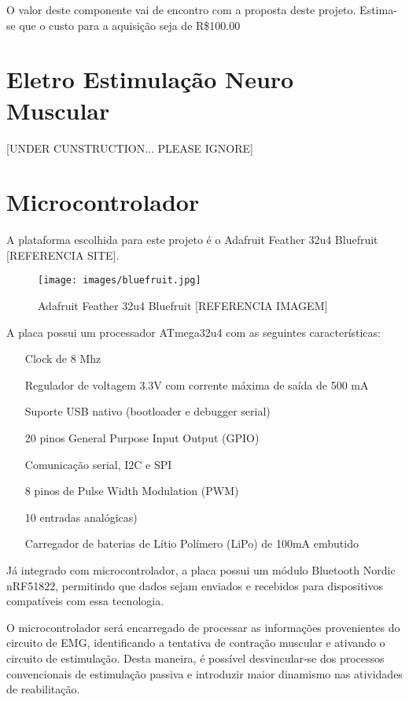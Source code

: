 \documentclass[rascunho,xindy]{fei}
\begin{document}
O valor deste componente vai de encontro com a proposta deste projeto. Estima-se que o custo para a aquisição seja de R\$100.00

\section{Eletro Estimulação Neuro Muscular}

[UNDER CUNSTRUCTION... PLEASE IGNORE]


\section{Microcontrolador}

A plataforma escolhida para este projeto é o Adafruit Feather 32u4 Bluefruit [REFERENCIA SITE].

\begin{figure}[!htb]
\centering
\texttt{[image: images/bluefruit.jpg]}
\caption{ Adafruit Feather 32u4 Bluefruit [REFERENCIA IMAGEM]}
\label{bluefruit}
\end{figure}

A placa possui um  processador ATmega32u4 com as seguintes características:

\begin{itemize}
\item[Clock de 8 Mhz]
\item[Regulador de voltagem 3.3V com corrente máxima de saída de 500 mA]
\item[Suporte USB nativo (bootloader e debugger serial)]
\item[20 pinos General Purpose Input Output (GPIO)]
\item[Comunicação serial, I2C e SPI]
\item[8 pinos de Pulse Width Modulation (PWM)]
\item[10 entradas analógicas)]
\item[Carregador de baterias de Lítio Polímero (LiPo) de 100mA embutido]
\end{itemize}

Já integrado com microcontrolador, a placa possui um módulo Bluetooth Nordic nRF51822, permitindo que dados sejam enviados e recebidos para dispositivos compatíveis com essa tecnologia.

O microcontrolador será encarregado de processar as informações provenientes do circuito de EMG, identificando a tentativa de contração muscular e ativando o circuito de estimulação. Desta maneira, é possível desvincular-se dos processos convencionais de estimulação passiva e introduzir maior dinamismo nas atividades de reabilitação.
\end{document}

